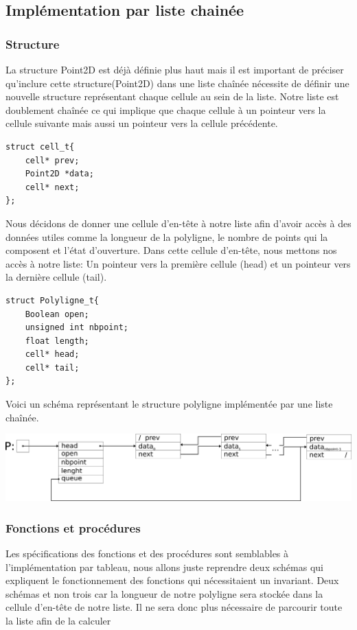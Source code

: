 \documentclass[a4paper, 11pt, oneside]{article}
\begin{document}
\subsection{Implémentation par liste chainée}

\subsubsection{Structure}

La structure Point2D est déjà définie plus haut mais il  est important de préciser qu'inclure cette structure(Point2D) dans une liste chaînée nécessite de définir une nouvelle structure représentant chaque cellule au sein de la liste. Notre liste est doublement chaînée ce qui implique que chaque cellule à un pointeur vers la cellule suivante mais aussi un pointeur vers la cellule précédente. 

\begin{lstlisting}
struct cell_t{
    cell* prev;
    Point2D *data;
    cell* next;
};
\end{lstlisting}


Nous décidons de donner une cellule d'en-tête à notre liste afin d'avoir accès à des données utiles comme la longueur de la polyligne, le nombre de points qui la composent et l'état d'ouverture. Dans cette cellule d'en-tête, nous mettons nos accès à notre liste: Un pointeur vers la première cellule (head) et un pointeur vers la dernière cellule (tail). 
\begin{lstlisting}
struct Polyligne_t{
    Boolean open;
    unsigned int nbpoint;
    float length;
    cell* head;
    cell* tail;
};
\end{lstlisting}

Voici un schéma représentant le structure polyligne implémentée par une liste chaînée.

\includegraphics[scale=0.7]{schemalist.png}

\subsubsection{Fonctions et procédures}

Les spécifications des fonctions et des procédures sont semblables à l'implémentation par tableau, nous allons juste reprendre deux schémas qui expliquent le fonctionnement des fonctions qui nécessitaient un invariant. Deux schémas et non trois car la longueur de notre polyligne sera stockée dans la cellule d'en-tête de notre liste. Il ne sera donc plus nécessaire de parcourir toute la liste afin de la calculer
\end{document}
